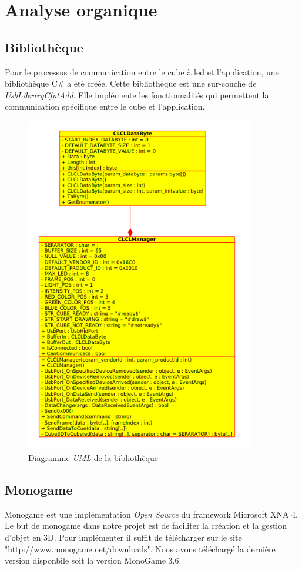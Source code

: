 \documentclass[a4paper,12pt]{article}
\begin{document}
\section{Analyse organique}
\subsection{Bibliothèque \clcl}
Pour le processus de communication entre le cube à led et l'application, une bibliothèque C\# a été créée. Cette bibliothèque est une sur-couche de \emph{UsbLibraryCfptAdd}. Elle implémente les fonctionnalités qui permettent la communication spécifique entre le cube et l'application.
\begin{figure}[htp]
	\centering
	\includegraphics[width=10cm]{./Img/uml_clcl.png}
	\caption{Diagramme \emph{UML} de la bibliothèque \clcl}
	\label{uml_clcl}
\end{figure}

\newpage
\subsection{Monogame}
Monogame est une implémentation \emph{Open Source} du framework Microsoft XNA 4. Le but de monogame dans notre projet est de faciliter la création et la gestion d'objet en 3D. Pour implémenter il suffit de télécharger sur le site "http://www.monogame.net/downloads". Nous avons téléchargé la dernière version disponbile soit la version MonoGame 3.6.
\end{document}
